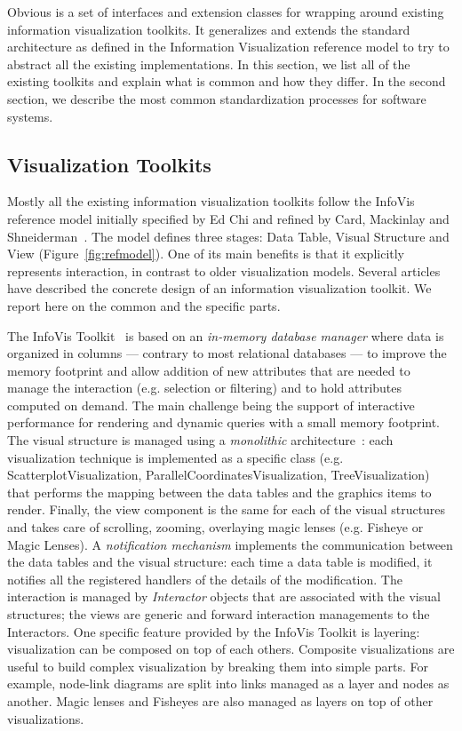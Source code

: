 Obvious is a set of interfaces and extension classes for wrapping
around existing information visualization toolkits.  It generalizes
and extends the standard architecture as defined in the Information
Visualization reference model to try to abstract all the existing
implementations.  In this section, we list all of the existing
toolkits and explain what is common and how they differ.  In the
second section, we describe the most common standardization processes
for software systems.

\subsection{Visualization Toolkits}

Mostly all the existing information visualization toolkits follow the
InfoVis reference model initially specified by Ed Chi and refined by
Card, Mackinlay and Shneiderman~\cite{ChiRefModel,ReadingsIV}.  The
model defines three stages: Data Table, Visual Structure and View
(Figure~\ref{fig:refmodel}).  One of its main benefits is that it
explicitly represents interaction, in contrast to older visualization models.
Several articles have described the concrete design of an information
visualization toolkit.  We report here on the common and the
specific parts.

The InfoVis Toolkit~\cite{InfoVis} is based on an \emph{in-memory
  database manager} where data is organized in columns --- contrary to
most relational databases --- to improve the memory footprint and
allow addition of new attributes that are needed to manage the interaction
(e.g. selection or filtering) and to hold attributes computed on
demand.  The main challenge being the support of interactive
performance for rendering and dynamic queries with a small memory
footprint.  The visual structure is managed using a \emph{monolithic}
architecture~\cite{Polylithic}: each visualization technique is
implemented as a specific class (e.g. ScatterplotVisualization,
ParallelCoordinatesVisualization, TreeVisualization) that performs the
mapping between the data tables and the graphics items to render.
Finally, the view component is the same for each of the visual
structures and takes care of scrolling, zooming, overlaying magic
lenses (e.g. Fisheye or Magic Lenses).   A \emph{notification mechanism}
implements the communication between the data tables and the visual
structure: each time a data table is modified, it notifies all the
registered handlers of the details of the modification. The
interaction is managed by \emph{Interactor} objects that are
associated with the visual structures; the views are generic and
forward interaction managements to the Interactors.  One specific
feature provided by the InfoVis Toolkit is layering: visualization can
be composed on top of each others.  Composite visualizations are
useful to build complex visualization by breaking them into simple
parts. For example, node-link diagrams are split into links managed as
a layer and nodes as another.  Magic lenses and Fisheyes are also
managed as layers on top of other visualizations.

